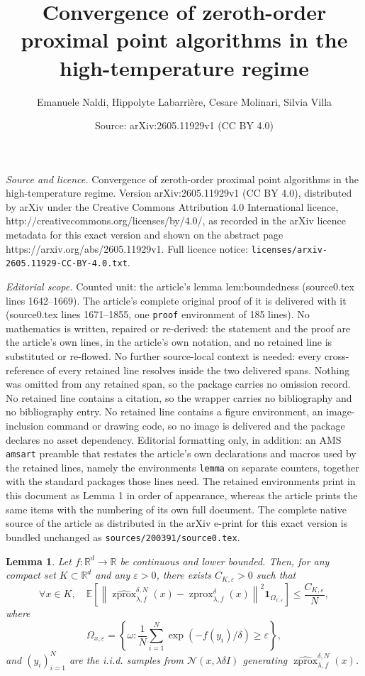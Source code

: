 \documentclass[10pt,a4paper]{amsart}
\title{Convergence of zeroth-order proximal point algorithms in the high-temperature regime}
\author{Emanuele Naldi, Hippolyte Labarri\`ere, Cesare Molinari, Silvia Villa}
\date{Source: arXiv:2605.11929v1 (CC BY 4.0)}
\newtheorem{lemma}{Lemma}
\newcommand{\R}{\mathbb{R}}
\newcommand{\szprox}{\ensuremath{\widehat{\operatorname{zprox}}}}
\newcommand{\zprox}{\ensuremath{\operatorname{zprox}}}
\begin{document}
\maketitle

\noindent\emph{Source and licence.} Convergence of zeroth-order proximal point algorithms in the high-temperature regime. Version arXiv:2605.11929v1 (CC BY 4.0), distributed by arXiv under the Creative Commons Attribution 4.0 International licence, http://creativecommons.org/licenses/by/4.0/, as recorded in the arXiv licence metadata for this exact version and shown on the abstract page https://arxiv.org/abs/2605.11929v1. Full licence notice: \texttt{licenses/arxiv-2605.11929-CC-BY-4.0.txt}.\par\smallskip

\noindent\textit{Editorial scope.} Counted unit: the article's lemma lem:boundedness (source0.tex lines 1642--1669). The article's complete original proof of it is delivered with it (source0.tex lines 1671--1855, one \texttt{proof} environment of 185 lines). No mathematics is written, repaired or re-derived: the statement and the proof are the article's own lines, in the article's own notation, and no retained line is substituted or re-flowed.  No further source-local context is needed: every cross-reference of every retained line resolves inside the two delivered spans.  Nothing was omitted from any retained span, so the package carries no omission record.  No retained line contains a citation, so the wrapper carries no bibliography and no bibliography entry.  No retained line contains a figure environment, an image-inclusion command or drawing code, so no image is delivered and the package declares no asset dependency.  Editorial formatting only, in addition: an AMS \texttt{amsart} preamble that restates the article's own declarations and macros used by the retained lines, namely the environments \texttt{lemma} on separate counters, together with the standard packages those lines need.  The retained environments print in this document as Lemma 1 in order of appearance, whereas the article prints the same items with the numbering of its own full document.  The complete native source of the article as distributed in the arXiv e-print for this exact version is bundled unchanged as \texttt{sources/200391/source0.tex}.
\begin{lemma}\label{lem:boundedness}
    Let \(f:\mathbb{R}^d\to \R\) be continuous and lower bounded. Then, for any compact set \(K\subset\R^d\) and any \(\varepsilon>0\), there exists \(C_{K,\varepsilon}>0\) such that
    \[
    \forall x\in K,\quad
    \mathbb{E}\left[
    \left\|
    \szprox^{\delta,N}_{\lambda, f}(x)
    -
    \zprox^{\delta}_{\lambda, f}(x)
    \right\|^2
    \mathbf{1}_{\Omega_{x,\varepsilon}}
    \right]
    \le
    \frac{C_{K,\varepsilon}}{N},
    \]
    where
    \[
    \Omega_{x,\varepsilon}
    =
    \left\{
    \omega:
    \frac{1}{N}\sum_{i=1}^N\exp(-f(y_i)/\delta)\ge\varepsilon
    \right\},
    \]
    and \(\left(y_i\right)_{i=1}^N\) are the i.i.d. samples from
    \(\mathcal{N}(x,\lambda\delta I)\) generating
    \(\szprox^{\delta,N}_{\lambda, f}(x)\).
\end{lemma}
\end{document}
